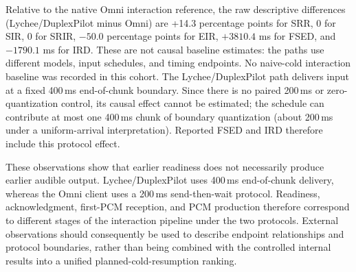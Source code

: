 \documentclass{article}
\begin{document}
Relative to the native Omni interaction reference, the raw descriptive
differences (Lychee/DuplexPilot minus Omni) are +14.3 percentage points
for SRR, 0 for SIR, 0 for SRIR, $-50.0$ percentage points for EIR,
$+3810.4$ ms for FSED, and $-1790.1$ ms for IRD. These are not causal
baseline estimates: the paths use different models, input schedules, and
timing endpoints. No naive-cold interaction baseline was recorded in this
cohort. The Lychee/DuplexPilot path delivers input at a fixed 400\,ms
end-of-chunk boundary. Since there is no paired 200\,ms or
zero-quantization control, its causal effect cannot be estimated; the
schedule can contribute at most one 400\,ms chunk of boundary
quantization (about 200\,ms under a uniform-arrival interpretation).
Reported FSED and IRD therefore include this protocol effect.

These observations show that earlier readiness does not necessarily
produce earlier audible output. Lychee/DuplexPilot uses 400\,ms
end-of-chunk delivery, whereas the Omni client uses a 200\,ms
send-then-wait protocol. Readiness, acknowledgment, first-PCM
reception, and PCM production therefore correspond to different stages
of the interaction pipeline under the two protocols. External
observations should consequently be used to describe endpoint
relationships and protocol boundaries, rather than being combined with
the controlled internal results into a unified planned-cold-resumption ranking.
\end{document}
